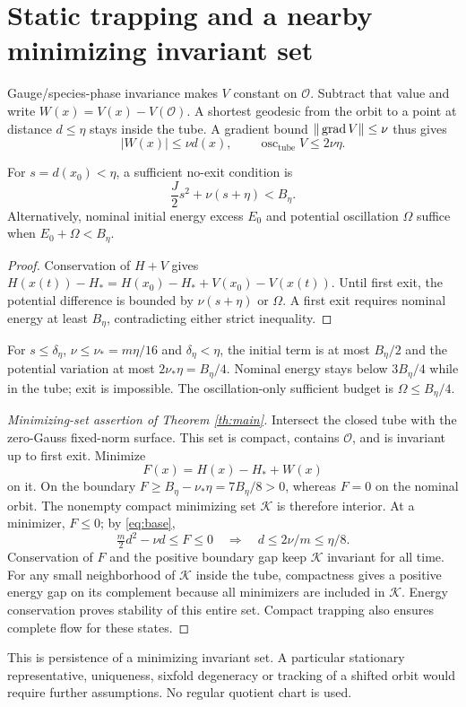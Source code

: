 \documentclass[11pt,a4paper]{article}
\begin{document}
\section{Static trapping and a nearby minimizing invariant set}
Gauge/species-phase invariance makes $V$ constant on $\mathcal O$. Subtract that value and write $W(x)=V(x)-V(\mathcal O)$. A shortest geodesic from the orbit to a point at distance $d\le\eta$ stays inside the tube. A gradient bound $\|\operatorname{grad} V\|\le\nu$ thus gives
\[
|W(x)|\le\nu d(x),\qquad
\operatorname{osc}_{\mathrm{tube}}V\le2\nu\eta.
\]
\begin{lemma}\label{lem:static}
For $s=d(x_0)<\eta$, a sufficient no-exit condition is
\[
\boxed{\frac J2s^2+\nu(s+\eta)<B_\eta.}
\]
Alternatively, nominal initial energy excess $E_0$ and potential oscillation $\Omega$ suffice when $E_0+\Omega<B_\eta$.
\end{lemma}
\begin{proof}
Conservation of $H+V$ gives $H(x(t))-H_*=H(x_0)-H_*+V(x_0)-V(x(t))$. Until first exit, the potential difference is bounded by $\nu(s+\eta)$ or $\Omega$. A first exit requires nominal energy at least $B_\eta$, contradicting either strict inequality.
\end{proof}
For $s\le\delta_\eta$, $\nu\le\nu_*=m\eta/16$ and $\delta_\eta<\eta$, the initial term is at most $B_\eta/2$ and the potential variation at most $2\nu_*\eta=B_\eta/4$. Nominal energy stays below $3B_\eta/4$ while in the tube; exit is impossible. The oscillation-only sufficient budget is $\Omega\le B_\eta/4$.

\begin{proof}[Minimizing-set assertion of Theorem \ref{th:main}]
Intersect the closed tube with the zero-Gauss fixed-norm surface. This set is compact, contains $\mathcal O$, and is invariant up to first exit. Minimize
\[
F(x)=H(x)-H_*+W(x)
\]
on it. On the boundary $F\ge B_\eta-\nu_*\eta=7B_\eta/8>0$, whereas $F=0$ on the nominal orbit. The nonempty compact minimizing set $\mathcal K$ is therefore interior. At a minimizer, $F\le0$; by \eqref{eq:base},
\[
\tfrac m2d^2-\nu d\le F\le0
\quad\Longrightarrow\quad d\le2\nu/m\le\eta/8.
\]
Conservation of $F$ and the positive boundary gap keep $\mathcal K$ invariant for all time. For any small neighborhood of $\mathcal K$ inside the tube, compactness gives a positive energy gap on its complement because all minimizers are included in $\mathcal K$. Energy conservation proves stability of this entire set. Compact trapping also ensures complete flow for these states.
\end{proof}
This is persistence of a minimizing invariant set. A particular stationary representative, uniqueness, sixfold degeneracy or tracking of a shifted orbit would require further assumptions. No regular quotient chart is used.
\newpage
\end{document}
